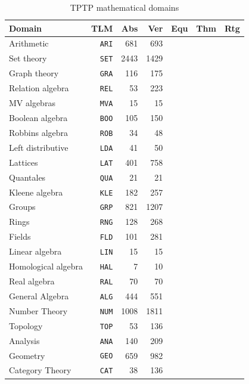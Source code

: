 \documentclass[runningheads]{llncs}
\begin{document}
\begin{table}[htb]
\begin{center}
\setlength{\tabcolsep}{4pt}
\begin{tabular}{lr|rr|rrr}
Domain              & TLM       & Abs  & Ver  & Equ & Thm & Rtg \\
\hline
Arithmetic          & {\tt ARI} &  681 &  693 & & & \\
Set theory          & {\tt SET} & 2443 & 1429 & & & \\
Graph theory        & {\tt GRA} &  116 &  175 & & & \\
Relation algebra    & {\tt REL} &   53 &  223 & & & \\
MV algebras         & {\tt MVA} &   15 &   15 & & & \\
Boolean algebra     & {\tt BOO} &  105 &  150 & & & \\
Robbins algebra     & {\tt ROB} &   34 &   48 & & & \\
Left distributive   & {\tt LDA} &   41 &   50 & & & \\
Lattices            & {\tt LAT} &  401 &  758 & & & \\
Quantales           & {\tt QUA} &   21 &   21 & & & \\
Kleene algebra      & {\tt KLE} &  182 &  257 & & & \\
Groups              & {\tt GRP} &  821 & 1207 & & & \\
Rings               & {\tt RNG} &  128 &  268 & & & \\
Fields              & {\tt FLD} &  101 &  281 & & & \\
Linear algebra      & {\tt LIN} &   15 &   15 & & & \\
Homological algebra & {\tt HAL} &    7 &   10 & & & \\
Real algebra        & {\tt RAL} &   70 &   70 & & & \\
General Algebra     & {\tt ALG} &  444 &  551 & & & \\
Number Theory       & {\tt NUM} & 1008 & 1811 & & & \\
Topology            & {\tt TOP} &   53 &  136 & & & \\
Analysis            & {\tt ANA} &  140 &  209 & & & \\
Geometry            & {\tt GEO} &  659 &  982 & & & \\
Category Theory     & {\tt CAT} &   38 &  136 & & & \\
\end{tabular}
\end{center}
\caption{TPTP mathematical domains}
\label{Domains}
\end{table}
\end{document}
